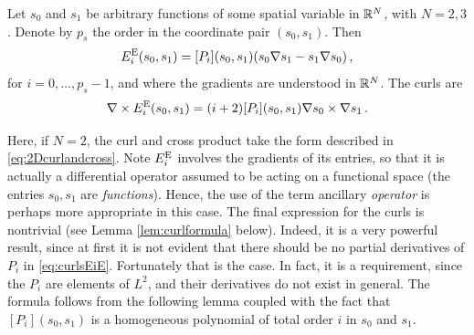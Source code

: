 
\begin{definition*}
Let $s_0$ and $s_1$ be arbitrary functions of some spatial variable in $\mathbb{R}^N$, with $N=2,3$. Denote by $p_s$ the order in the coordinate pair $(s_0,s_1)$. Then
\begin{equation}
    E^{\mathrm{E}}_i(s_0,s_1)=[P_i](s_0,s_1)(s_0\nabla s_1-s_1\nabla s_0)\,,\label{eq:Hcurledgefunctions}
\end{equation}
for $i=0,\ldots,p_s-1$, and where the gradients are understood in $\mathbb{R}^N$. The curls are
\begin{equation}
    \nabla\times E_i^{\mathrm{E}}(s_0,s_1)=(i+2)[P_i](s_0,s_1)\nabla s_0\times\nabla s_1\,.\label{eq:curlsEiE}
\end{equation}
\end{definition*}

Here, if $N=2$, the curl and cross product take the form described in \eqref{eq:2Dcurlandcross}. 
Note $E_i^{\mathrm{E}}$ involves the gradients of its entries, so that it is actually a differential operator assumed to be acting on a functional space (the entries $s_0,s_1$ are \textit{functions}). 
Hence, the use of the term ancillary \textit{operator} is perhaps more appropriate in this case.
The final expression for the curls is nontrivial (see Lemma \ref{lem:curlformula} below). 
Indeed, it is a very powerful result, since at first it is not evident that there should be no partial derivatives of $P_i$ in \eqref{eq:curlsEiE}. 
Fortunately that is the case. 
In fact, it is a requirement, since the $P_i$ are elements of $L^2$, and their derivatives do not exist in general.
The formula follows from the following lemma coupled with the fact that $[P_i](s_0,s_1)$ is a homogeneous polynomial of total order $i$ in $s_0$ and $s_1$.

